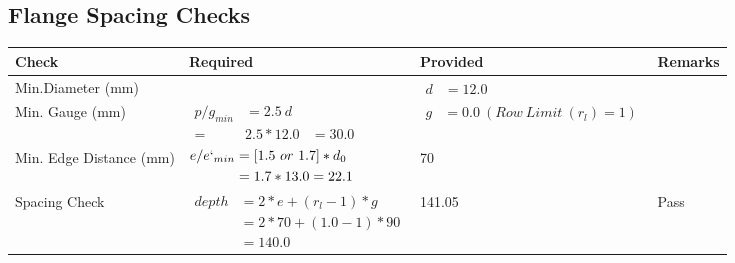 \documentclass{article}%
\begin{document}
\subsection{Flange Spacing Checks}%
\label{subsec:FlangeSpacingChecks}%
\renewcommand{\arraystretch}{1.2}%
\begin{longtable}{|p{2.5cm}|p{7.5cm}|p{5cm}|p{1cm}|}%
\hline%
\rowcolor{OsdagGreen}%
Check&Required&Provided&Remarks\\%
\hline%
\endhead%
\hline%
Min.Diameter (mm)&&$\begin{aligned} d &=12.0\end{aligned}$&\\%
\hline%
Min. Gauge (mm)&$\begin{aligned}p/g_{min}&= 2.5 ~ d&\\ =&2.5*12.0&=30.0\end{aligned}$&$\begin{aligned} g &=0.0~(Row~Limit~(r_l) = 1)\end{aligned}$&\\%
\hline%
Min. Edge Distance (mm)&$\begin{aligned}e/e`_{min} &=[1.5~or~ 1.7] * d_0\\ &=1.7*13.0=22.1 \end{aligned}$&70&\\%
\hline%
Spacing Check&$\begin{aligned} depth & = 2 * e + (r_l -1) * g\\ & = 2 * 70+(1.0-1)*90\\ & = 140.0\end{aligned}$&141.05&Pass\\%
\hline%
\end{longtable}

%
\newpage%
\end{document}
